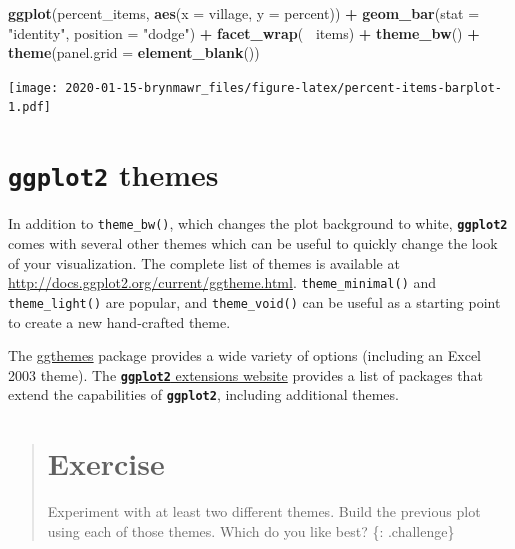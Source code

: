 \documentclass[]{book}
\newenvironment{Shaded}{\begin{snugshade}}{\end{snugshade}}
\newcommand{\KeywordTok}[1]{\textcolor[rgb]{0.13,0.29,0.53}{\textbf{#1}}}
\newcommand{\DataTypeTok}[1]{\textcolor[rgb]{0.13,0.29,0.53}{#1}}
\newcommand{\StringTok}[1]{\textcolor[rgb]{0.31,0.60,0.02}{#1}}
\newcommand{\OperatorTok}[1]{\textcolor[rgb]{0.81,0.36,0.00}{\textbf{#1}}}
\newcommand{\NormalTok}[1]{#1}
\begin{document}
\begin{Shaded}
\begin{Highlighting}[]
\KeywordTok{ggplot}\NormalTok{(percent_items, }\KeywordTok{aes}\NormalTok{(}\DataTypeTok{x =}\NormalTok{ village, }\DataTypeTok{y =}\NormalTok{ percent)) }\OperatorTok{+}
\StringTok{    }\KeywordTok{geom_bar}\NormalTok{(}\DataTypeTok{stat =} \StringTok{"identity"}\NormalTok{, }\DataTypeTok{position =} \StringTok{"dodge"}\NormalTok{) }\OperatorTok{+}
\StringTok{    }\KeywordTok{facet_wrap}\NormalTok{(}\OperatorTok{~}\StringTok{ }\NormalTok{items) }\OperatorTok{+}
\StringTok{    }\KeywordTok{theme_bw}\NormalTok{() }\OperatorTok{+}
\StringTok{    }\KeywordTok{theme}\NormalTok{(}\DataTypeTok{panel.grid =} \KeywordTok{element_blank}\NormalTok{())}
\end{Highlighting}
\end{Shaded}

\texttt{[image: 2020-01-15-brynmawr\_files/figure-latex/percent-items-barplot-1.pdf]}

\section{\texorpdfstring{\textbf{\texttt{ggplot2}}
themes}{ggplot2 themes}}\label{ggplot2-themes}

In addition to \texttt{theme\_bw()}, which changes the plot background
to white, \textbf{\texttt{ggplot2}} comes with several other themes
which can be useful to quickly change the look of your visualization.
The complete list of themes is available at
\url{http://docs.ggplot2.org/current/ggtheme.html}.
\texttt{theme\_minimal()} and \texttt{theme\_light()} are popular, and
\texttt{theme\_void()} can be useful as a starting point to create a new
hand-crafted theme.

The
\href{https://jrnold.github.io/ggthemes/reference/index.html}{ggthemes}
package provides a wide variety of options (including an Excel 2003
theme). The
\href{https://www.ggplot2-exts.org}{\textbf{\texttt{ggplot2}} extensions
website} provides a list of packages that extend the capabilities of
\textbf{\texttt{ggplot2}}, including additional themes.

\begin{quote}
\section{Exercise}\label{exercise-15}

Experiment with at least two different themes. Build the previous plot
using each of those themes. Which do you like best? \{: .challenge\}
\end{quote}
\end{document}

